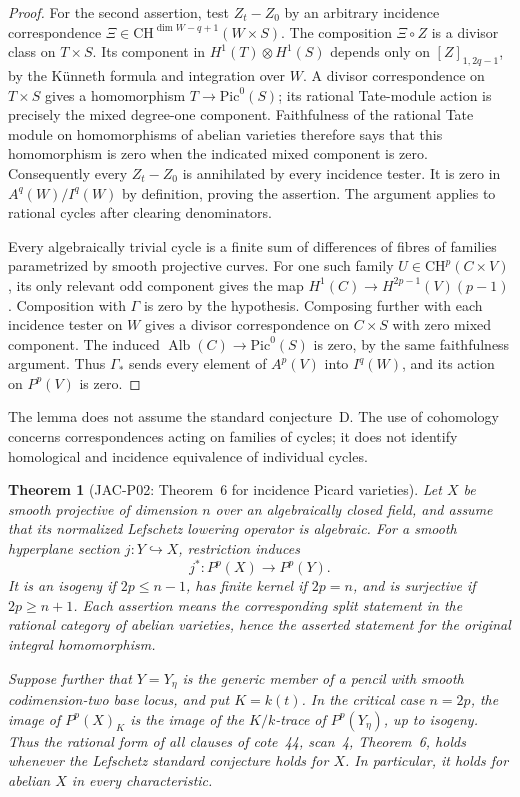 \documentclass[11pt,a4paper]{article}
\newtheorem{theorem}{Theorem}[section]
\begin{document}
\begin{proof}
For the second assertion, test $Z_t-Z_0$ by an arbitrary incidence
correspondence
$\Xi\in\mathrm{CH}^{\dim W-q+1}(W\times S)$.
The composition $\Xi\circ Z$ is a divisor class on $T\times S$.
Its component in $H^1(T)\otimes H^1(S)$ depends only on
$[Z]_{1,2q-1}$, by the K\"unneth formula and integration over $W$.
A divisor correspondence on $T\times S$ gives a homomorphism
$T\to\mathrm{Pic}^0(S)$; its rational Tate-module action is precisely
the mixed degree-one component.  Faithfulness of the rational Tate
module on homomorphisms of abelian varieties therefore says that this
homomorphism is zero when the indicated mixed component is zero.
Consequently every $Z_t-Z_0$ is annihilated by every incidence tester.
It is zero in $A^q(W)/I^q(W)$ by definition, proving the assertion.
The argument applies to rational cycles after clearing denominators.

Every algebraically trivial cycle is a finite sum of differences of
fibres of families parametrized by smooth projective curves.
For one such family
$U\in\mathrm{CH}^{p}(C\times V)$, its only relevant odd component
gives the map $H^1(C)\to H^{2p-1}(V)(p-1)$.
Composition with $\Gamma$ is zero by the hypothesis.  Composing further
with each incidence tester on $W$ gives a divisor correspondence on
$C\times S$ with zero mixed component.  The induced
$\operatorname{Alb}(C)\to\mathrm{Pic}^0(S)$ is zero, by the same
faithfulness argument.  Thus $\Gamma_*$ sends every element of
$A^p(V)$ into $I^q(W)$, and its action on $P^p(V)$ is zero.
\end{proof}

The lemma does not assume the standard conjecture~D.  The use of
cohomology concerns correspondences acting on families of cycles;
it does not identify homological and incidence equivalence of individual
cycles.

\begin{theorem}[JAC-P02: Theorem~6 for incidence Picard varieties]
\label{jac:P02}
Let $X$ be smooth projective of dimension $n$ over an algebraically
closed field, and assume that its normalized Lefschetz lowering
operator is algebraic.  For a smooth hyperplane section $j:Y\hookrightarrow X$,
restriction induces
\[
 j^*:P^p(X)\longrightarrow P^p(Y).
\]
It is an isogeny if $2p\le n-1$, has finite kernel if $2p=n$, and
is surjective if $2p\ge n+1$.  Each assertion means the corresponding
split statement in the rational category of abelian varieties, hence
the asserted statement for the original integral homomorphism.

Suppose further that $Y=Y_\eta$ is the generic member of a pencil with
smooth codimension-two base locus, and put $K=k(t)$.  In the critical
case $n=2p$, the image of $P^p(X)_K$ is the image of the $K/k$-trace
of $P^p(Y_\eta)$, up to isogeny.  Thus the rational form of all clauses
of cote~44, scan~4, Theorem~6, holds whenever the Lefschetz standard
conjecture holds for $X$.  In particular, it holds for abelian $X$
in every characteristic.
\end{theorem}
\end{document}
